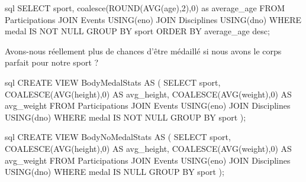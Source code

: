 \documentclass{mytex}
\begin{document}


\begin{codeboxlang}[title=Age moyen des médaillés par sport]{sql}
	SELECT sport, coalesce(ROUND(AVG(age),2),0) as average_age
	FROM Participations
	JOIN Events USING(eno)
	JOIN Disciplines USING(dno)
	WHERE medal IS NOT NULL
	GROUP BY sport
	ORDER BY average_age desc;
\end{codeboxlang}




Avons-nous réellement plus de chances d'être médaillé si nous avons le corps parfait pour notre sport ?


\begin{codeboxlang}[title=Physique des médaillés par sport]{sql}
	CREATE VIEW BodyMedalStats AS (
	SELECT sport, COALESCE(AVG(height),0) AS avg_height, COALESCE(AVG(weight),0) AS avg_weight
	FROM Participations
	JOIN Events USING(eno)
	JOIN Disciplines USING(dno)
	WHERE medal IS NOT NULL
	GROUP BY sport
	);
\end{codeboxlang}



\begin{codeboxlang}[title=Physique des non-médaillés par sport]{sql}
	CREATE VIEW BodyNoMedalStats AS (
	SELECT sport, COALESCE(AVG(height),0) AS avg_height, COALESCE(AVG(weight),0) AS avg_weight
	FROM Participations
	JOIN Events USING(eno)
	JOIN Disciplines USING(dno)
	WHERE medal IS NULL
	GROUP BY sport
	);
\end{codeboxlang}


\end{document}
